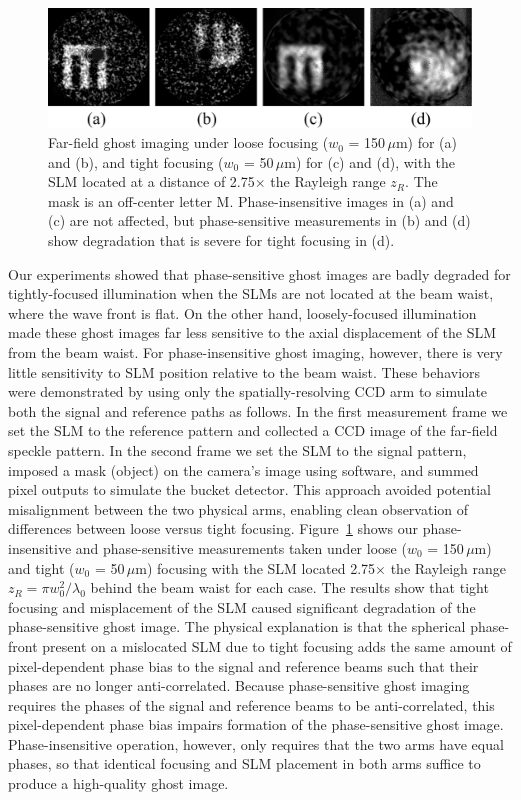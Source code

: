 \begin{figure}[htb]
\centerline{\includegraphics[width=14cm]{figure-ghost-blur.pdf}}
\caption{Far-field ghost imaging under loose focusing ($w_0$ = 150\,$\mu$m) for (a) and (b), and tight focusing ($w_0$ = 50\,$\mu$m) for (c) and (d), with the SLM located at a distance of 2.75$\times$ the Rayleigh range $z_R$. The mask is an off-center letter M.  
Phase-insensitive images in (a) and (c) are not affected, but 
phase-sensitive measurements in (b) and (d) show degradation that is severe for tight focusing in (d).}
\label{figure:ghost-blur}
\end{figure}

Our experiments showed that phase-sensitive ghost images are badly degraded for tightly-focused illumination when the SLMs are not located at the beam waist, where the wave front is flat. On the other hand, loosely-focused illumination made these ghost images far less sensitive to the axial displacement of the SLM from the beam waist. For phase-insensitive ghost imaging, however, there is very little sensitivity to SLM position relative to the beam waist.  These behaviors were demonstrated by using only the spatially-resolving CCD arm to simulate both the signal and reference paths as follows.  In the first measurement frame we set the SLM to the reference pattern and collected a CCD image of the far-field speckle pattern.  In the second frame we set the SLM to the signal pattern, imposed a mask (object) on the camera's image using software, and summed pixel outputs to simulate the bucket detector. This approach avoided potential misalignment between the two physical arms, enabling clean observation of differences between loose versus tight focusing. Figure~\ref{figure:ghost-blur} shows our phase-insensitive and phase-sensitive measurements taken under loose ($w_0$ = 150\,$\mu$m) and tight ($w_0$ = 50\,$\mu$m) focusing with the SLM located 2.75$\times$ the Rayleigh range $z_R=\pi w_0^2/\lambda_0$ behind the beam waist for each case. The results show that tight focusing and misplacement of the SLM caused significant degradation of the phase-sensitive ghost image. The physical explanation is that the spherical phase-front present on a mislocated SLM due to tight focusing adds the same amount of pixel-dependent phase bias to the signal and reference beams such that their phases are no longer anti-correlated.   Because phase-sensitive ghost imaging requires the phases of the signal and reference beams to be anti-correlated, this pixel-dependent phase bias impairs formation of the phase-sensitive ghost image.  Phase-insensitive operation, however, only requires that the two arms have equal phases, so that identical focusing and SLM placement in both arms suffice to produce a high-quality ghost image.

